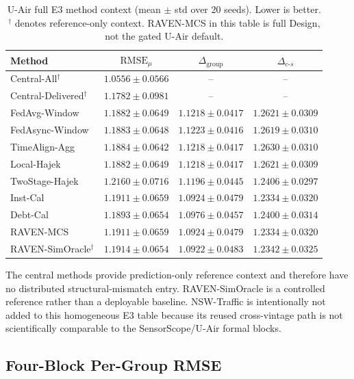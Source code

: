 \begin{table}[!htbp]
\centering
\caption{U-Air full E3 method context (mean $\pm$ std over 20 seeds).
Lower is better.  $^\dagger$ denotes reference-only context.
RAVEN-MCS in this table is full Design, not the gated U-Air default.}
\label{tab:app_e3_uair}
\scriptsize
\setlength{\tabcolsep}{3pt}
\begin{tabular*}{\columnwidth}{@{\extracolsep{\fill}}lccc}
\toprule
Method & $\mathrm{RMSE}_{\mu}$ & $\Delta_{\mathrm{group}}$ & $\Delta_{c\text{-}s}$\\
\midrule
Central-All$^{\dagger}$ & $1.0556\pm0.0566$ & -- & -- \\
Central-Delivered$^{\dagger}$ & $1.1782\pm0.0981$ & -- & -- \\
FedAvg-Window & $1.1882\pm0.0649$ & $1.1218\pm0.0417$ & $1.2621\pm0.0309$ \\
FedAsync-Window & $1.1883\pm0.0648$ & $1.1223\pm0.0416$ & $1.2619\pm0.0310$ \\
TimeAlign-Agg & $1.1884\pm0.0642$ & $1.1218\pm0.0417$ & $1.2630\pm0.0310$ \\
Local-Hajek & $1.1882\pm0.0649$ & $1.1218\pm0.0417$ & $1.2621\pm0.0309$ \\
TwoStage-Hajek & $1.2160\pm0.0716$ & $1.1196\pm0.0445$ & $1.2406\pm0.0297$ \\
Inst-Cal & $1.1911\pm0.0659$ & $1.0924\pm0.0479$ & $1.2334\pm0.0320$ \\
Debt-Cal & $1.1893\pm0.0654$ & $1.0976\pm0.0457$ & $1.2400\pm0.0314$ \\
RAVEN-MCS & $1.1911\pm0.0659$ & $1.0924\pm0.0479$ & $1.2334\pm0.0320$ \\
RAVEN-SimOracle$^{\dagger}$ & $1.1914\pm0.0654$ & $1.0922\pm0.0483$ & $1.2342\pm0.0325$ \\
\bottomrule
\end{tabular*}
\end{table}

The central methods provide prediction-only reference context and therefore
have no distributed structural-mismatch entry.  RAVEN-SimOracle is a controlled
reference rather than a deployable baseline.  NSW-Traffic is intentionally not
added to this homogeneous E3 table because its reused cross-vintage path is not
scientifically comparable to the SensorScope/U-Air formal blocks.

\subsection{Four-Block Per-Group RMSE}
\label{app:block_rmse}


